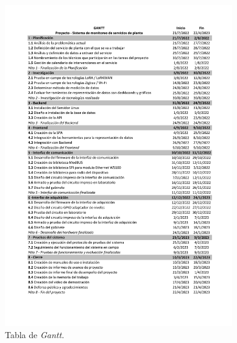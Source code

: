 \documentclass[
11pt%
]{charter}
\begin{document}
\begin{figure}[H]
\centering

\includegraphics[width=0.88\textwidth]{./Figuras/tablagantt.pdf}

\caption{Tabla de \textit{Gantt.}}
\label{fig:gantt1}
\end{figure}
\end{document}
